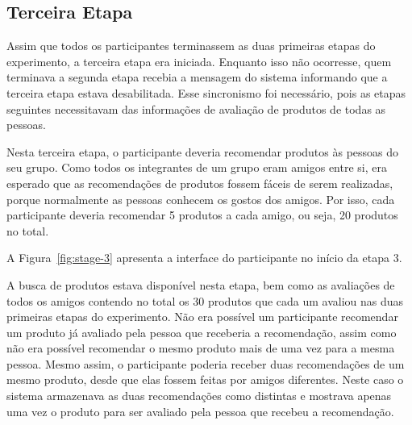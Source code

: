 \subsection{Terceira Etapa}

Assim que todos os participantes terminassem as duas primeiras etapas do experimento, a terceira etapa era iniciada. Enquanto isso não ocorresse, quem terminava a segunda etapa recebia a mensagem do sistema informando que a terceira etapa estava desabilitada. Esse sincronismo foi necessário, pois as etapas seguintes necessitavam das informações de avaliação de produtos de todas as pessoas.

Nesta terceira etapa, o participante deveria recomendar produtos às pessoas do seu grupo. Como todos os integrantes de um grupo eram amigos entre si, era esperado que as recomendações de produtos fossem fáceis de serem realizadas, porque normalmente as pessoas conhecem os gostos dos amigos. Por isso, cada participante deveria recomendar 5 produtos a cada amigo, ou seja, 20 produtos no total.

A Figura~\ref{fig:stage-3} apresenta a interface do participante no início da etapa 3.

A busca de produtos estava disponível nesta etapa, bem como as avaliações de todos os amigos contendo no total os 30 produtos que cada um avaliou nas duas primeiras etapas do experimento. Não era possível um participante recomendar um produto já avaliado pela pessoa que receberia a recomendação, assim como não era possível recomendar o mesmo produto mais de uma vez para a mesma pessoa. Mesmo assim, o participante poderia receber duas recomendações de um mesmo produto, desde que elas fossem feitas por amigos diferentes. Neste caso o sistema armazenava as duas recomendações como distintas e mostrava apenas uma vez o produto para ser avaliado pela pessoa que recebeu a recomendação.

